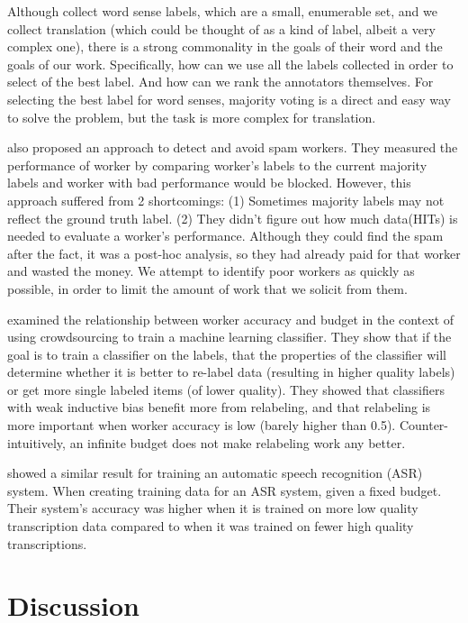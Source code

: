 \documentclass[11pt]{article}
\begin{document}
Although  collect word sense labels, which are a small, enumerable set, and we collect translation (which could be thought of as a kind of label, albeit a very complex one), there is a strong commonality in the goals of their word and the goals of our work.  Specifically, how can we use all the labels collected in order to select of the best label.  And how can we rank the annotators themselves.  For selecting the best label for word senses, majority voting is a direct and easy way to solve the problem, but the task is more complex for translation. 

 also proposed an approach to detect and avoid spam workers. 
They measured the performance of worker by comparing worker's labels to the current majority labels and worker with bad performance would be blocked. However, this approach suffered from 2 shortcomings: (1) Sometimes majority labels may not reflect the ground truth label. (2) They didn't figure out  how much data(HITs) is needed to evaluate a worker's performance. Although they could find the spam after the fact, it was a post-hoc analysis, so they had already paid for that worker and wasted the money.  We attempt to identify poor workers as quickly as possible, in order to limit the amount of work that we solicit from them.

 examined the relationship between worker accuracy and budget in the context of using crowdsourcing to train a machine learning classifier.  They show that if the goal is to train a classifier on the labels, that the properties of the classifier will determine whether it is better to re-label data (resulting in higher quality labels) or get more single labeled items (of lower quality). They showed that classifiers with weak inductive bias  benefit more from relabeling, and that relabeling is more important when worker accuracy is low (barely higher than 0.5). 
Counter-intuitively, an infinite budget does not make relabeling work any better.

 showed a similar result for training an automatic speech recognition (ASR) system.  When creating training data for an ASR system, given a fixed budget. Their system's accuracy was higher when it is trained on more low quality transcription data compared to when it was trained on fewer high quality transcriptions.

\section{Discussion}
\end{document}
